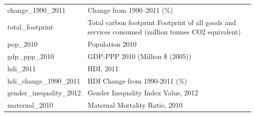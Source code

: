 \documentclass[11pt]{article}
\begin{document}
\begin{longtable}[]{@{}ll@{}}
\begin{minipage}[t]{0.20\columnwidth}
change\_1990\_2011\strut
\end{minipage} & \begin{minipage}[t]{0.13\columnwidth}\raggedright\strut
Change from 1990--2011 (\%)\strut
\end{minipage}\tabularnewline
\begin{minipage}[t]{0.20\columnwidth}\raggedright\strut
total\_footprint\strut
\end{minipage} & \begin{minipage}[t]{0.13\columnwidth}\raggedright\strut
Total carbon footprint Footprint of all goods and services consumed
(million tonnes CO2 equivalent)\strut
\end{minipage}\tabularnewline
\begin{minipage}[t]{0.20\columnwidth}\raggedright\strut
pop\_2010\strut
\end{minipage} & \begin{minipage}[t]{0.13\columnwidth}\raggedright\strut
Population 2010\strut
\end{minipage}\tabularnewline
\begin{minipage}[t]{0.20\columnwidth}\raggedright\strut
gdp\_ppp\_2010\strut
\end{minipage} & \begin{minipage}[t]{0.13\columnwidth}\raggedright\strut
GDP-PPP 2010 (Million \$ (2005))\strut
\end{minipage}\tabularnewline
\begin{minipage}[t]{0.20\columnwidth}\raggedright\strut
hdi\_2011\strut
\end{minipage} & \begin{minipage}[t]{0.13\columnwidth}\raggedright\strut
HDI, 2011\strut
\end{minipage}\tabularnewline
\begin{minipage}[t]{0.20\columnwidth}\raggedright\strut
hdi\_change\_1990\_2011\strut
\end{minipage} & \begin{minipage}[t]{0.13\columnwidth}\raggedright\strut
HDI Change from 1990-2011 (\%)\strut
\end{minipage}\tabularnewline
\begin{minipage}[t]{0.20\columnwidth}\raggedright\strut
gender\_inequality\_2012\strut
\end{minipage} & \begin{minipage}[t]{0.13\columnwidth}\raggedright\strut
Gender Inequality Index Value, 2012\strut
\end{minipage}\tabularnewline
\begin{minipage}[t]{0.20\columnwidth}\raggedright\strut
maternal\_2010\strut
\end{minipage} & \begin{minipage}[t]{0.13\columnwidth}\raggedright\strut
Maternal Mortality Ratio, 2010\strut
\end{minipage}\tabularnewline
\bottomrule
\end{longtable}
\end{document}
